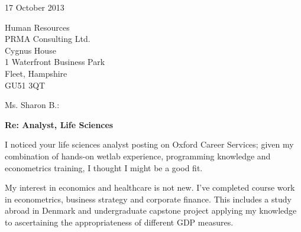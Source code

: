 \documentclass{../res}
\begin{document}
 
\begin{sloppypar}
 
 

\address{2115 Cloville Avenue\\
         Baltimore, MD 21214\\
         \texttt{+}1 443 257 5953}
\address{\texttt{ryan.m.harrison@gmail.com}\\
         \texttt{linkedin.com/in/rmharri}\\
         \texttt{github.com/rmharrison}}
\address{Wolfson College\\ 
         Oxford OX2 6UD\\
         \texttt{+}44 07523 229446}

\begin{resume} 
 
\vspace{2\baselineskip}

17 October 2013
\vspace{1\baselineskip}

Human Resources \\
PRMA Consulting Ltd. \\
Cygnus House \\
1 Waterfront Business Park \\
Fleet, Hampshire \\
GU51 3QT
\vspace{1\baselineskip}

Ms. Sharon B.:

\textbf{Re: Analyst, Life Sciences}

I noticed your life sciences analyst posting on Oxford Career Services; given my combination of hands-on wetlab experience, programming knowledge and econometrics training, I thought I might be a good fit.

My interest in economics and healthcare is not new. I've completed course work in econometrics, business strategy and corporate finance. This includes a study abroad in Denmark and undergraduate capstone project applying my knowledge to ascertaining the appropriateness of different GDP measures. 


\end{resume}
\end{sloppypar}
\end{document}
